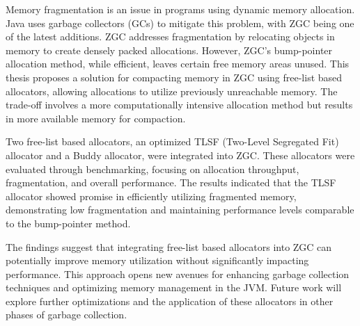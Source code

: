 
Memory fragmentation is an issue in programs using dynamic memory allocation. Java uses garbage collectors (GCs) to mitigate this problem, with ZGC being one of the latest additions. ZGC addresses fragmentation by relocating objects in memory to create densely packed allocations. However, ZGC's bump-pointer allocation method, while efficient, leaves certain free memory areas unused. This thesis proposes a solution for compacting memory in ZGC using free-list based allocators, allowing allocations to utilize previously unreachable memory. The trade-off involves a more computationally intensive allocation method but results in more available memory for compaction.

Two free-list based allocators, an optimized TLSF (Two-Level Segregated Fit) allocator and a Buddy allocator, were integrated into ZGC. These allocators were evaluated through benchmarking, focusing on allocation throughput, fragmentation, and overall performance. The results indicated that the TLSF allocator showed promise in efficiently utilizing fragmented memory, demonstrating low fragmentation and maintaining performance levels comparable to the bump-pointer method.

The findings suggest that integrating free-list based allocators into ZGC can potentially improve memory utilization without significantly impacting performance. This approach opens new avenues for enhancing garbage collection techniques and optimizing memory management in the JVM. Future work will explore further optimizations and the application of these allocators in other phases of garbage collection.

